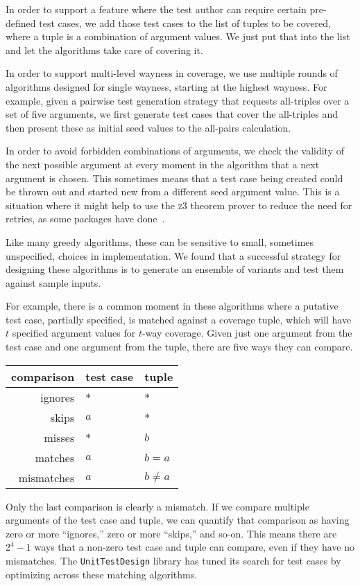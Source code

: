 \documentclass{juliacon}
\newcommand{\utd}{\texttt{UnitTestDesign}\xspace}
\begin{document}
\vskip 6pt
In order to support a feature where the test author can require certain pre-defined test cases, we add those test cases to the list of tuples to be covered, where a tuple is a combination of argument values. We just put that into the list and let the algorithms take care of covering it.

\vskip 6pt
In order to support multi-level wayness in coverage, we use multiple rounds of algorithms designed for single wayness, starting at the highest wayness. For example, given a pairwise test generation strategy that requests all-triples over a set of five arguments, we first generate test cases that cover the all-triples and then present these as initial seed values to the all-pairs calculation.

\vskip 6pt
In order to avoid forbidden combinations of arguments, we check the validity of the next possible argument at every moment in the algorithm that a next argument is chosen. This sometimes means that a test case being created could be thrown out and started new from a different seed argument value. This is a situation where it might help to use the \textsc{z3} theorem prover to reduce the need for retries, as some packages have done~\cite{Nie2011-yl}.

\vskip 6pt
Like many greedy algorithms, these can be sensitive to small, sometimes unspecified, choices in implementation. We found that a successful strategy for designing these algorithms is to generate an ensemble of variants and test them against sample inputs.

\vskip 6pt
For example, there is a common moment in these algorithms where a putative test case, partially specified, is matched against a coverage tuple, which will have $t$ specified argument values for $t$-way coverage. Given just one argument from the test case and one argument from the tuple, there are five ways they can compare.
\begin{center}
\begin{tabular}{rll}
comparison & test case & tuple \\ \hline
ignores & * & * \\
skips & $a$ & * \\
misses & * & $b$ \\
matches & $a$ & $b=a$ \\
mismatches & $a$ & $b\ne a$
\end{tabular}
\end{center}
Only the last comparison is clearly a mismatch. If we compare multiple arguments of the test case and tuple, we can quantify that comparison as having zero or more ``ignores,'' zero or more ``skips,'' and so-on. This means there are $2^4-1$ ways that a non-zero test case and tuple can compare, even if they have no mismatches. The \utd library has tuned its search for test cases by optimizing across these matching algorithms.
\end{document}
